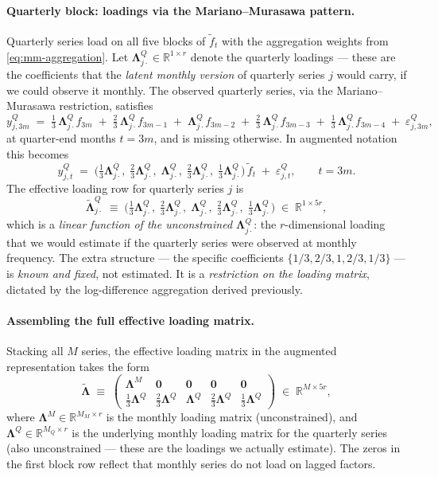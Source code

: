 \documentclass[11pt, a4paper, oneside]{article}
\newcommand{\mL}{\boldsymbol{\Lambda}}
\begin{document}
\paragraph{Quarterly block: loadings via the Mariano–Murasawa pattern.}
Quarterly series load on all five blocks of $\tilde{f}_t$ with the
aggregation weights from \eqref{eq:mm-aggregation}. Let
$\mL^Q_{j\cdot} \in \mathbb{R}^{1 \times r}$ denote the quarterly
loadings — these are the coefficients that the \emph{latent monthly
version} of quarterly series $j$ would carry, if we could observe it
monthly. The observed quarterly series, via the Mariano–Murasawa
restriction, satisfies
\begin{equation}
y^Q_{j, 3m} \;=\; \tfrac{1}{3}\,\mL^Q_{j\cdot} f_{3m}
\;+\; \tfrac{2}{3}\,\mL^Q_{j\cdot} f_{3m-1}
\;+\; \mL^Q_{j\cdot} f_{3m-2}
\;+\; \tfrac{2}{3}\,\mL^Q_{j\cdot} f_{3m-3}
\;+\; \tfrac{1}{3}\,\mL^Q_{j\cdot} f_{3m-4}
\;+\; \varepsilon^Q_{j, 3m},
\label{eq:mm-observation}
\end{equation}
at quarter-end months $t = 3m$, and is missing otherwise. In augmented
notation this becomes
\[
y^Q_{j, t} \;=\; \big(\tfrac{1}{3}\mL^Q_{j\cdot},\; \tfrac{2}{3}\mL^Q_{j\cdot},\; \mL^Q_{j\cdot},\; \tfrac{2}{3}\mL^Q_{j\cdot},\; \tfrac{1}{3}\mL^Q_{j\cdot}\big)\, \tilde{f}_t \;+\; \varepsilon^Q_{j, t},
\qquad t = 3m.
\]
The effective loading row for quarterly series $j$ is
\[
\tilde{\mL}^Q_{j\cdot} \;\equiv\; \big(\tfrac{1}{3}\mL^Q_{j\cdot},\; \tfrac{2}{3}\mL^Q_{j\cdot},\; \mL^Q_{j\cdot},\; \tfrac{2}{3}\mL^Q_{j\cdot},\; \tfrac{1}{3}\mL^Q_{j\cdot}\big) \;\in\; \mathbb{R}^{1 \times 5r},
\]
which is a \emph{linear function of the unconstrained $\mL^Q_{j\cdot}$}:
the $r$-dimensional loading that we would estimate if the quarterly
series were observed at monthly frequency. The extra structure — the
specific coefficients $\{1/3, 2/3, 1, 2/3, 1/3\}$ — is \emph{known and
fixed}, not estimated. It is a \emph{restriction on the loading
matrix}, dictated by the log-difference aggregation derived previously.

\paragraph{Assembling the full effective loading matrix.}
Stacking all $M$ series, the effective loading matrix in the augmented
representation takes the form
\begin{equation}
\tilde{\mL} \;\equiv\; \begin{pmatrix}
\mL^M & \mathbf{0} & \mathbf{0} & \mathbf{0} & \mathbf{0} \\
\tfrac{1}{3}\mL^Q & \tfrac{2}{3}\mL^Q & \mL^Q & \tfrac{2}{3}\mL^Q & \tfrac{1}{3}\mL^Q
\end{pmatrix} \;\in\; \mathbb{R}^{M \times 5r},
\label{eq:mm-loading-full}
\end{equation}
where $\mL^M \in \mathbb{R}^{M_M \times r}$ is the monthly loading
matrix (unconstrained), and $\mL^Q \in \mathbb{R}^{M_Q \times r}$ is
the underlying monthly loading matrix for the quarterly series (also
unconstrained — these are the loadings we actually estimate). The
zeros in the first block row reflect that monthly series do not load
on lagged factors.
\end{document}
